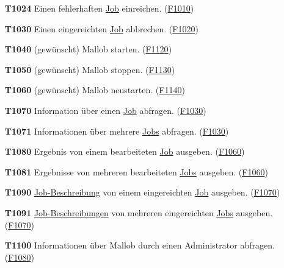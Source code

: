 \begin{itemize}
    \item[\textbf{T1024}] Einen fehlerhaften \hyperref[B:Jobs]{Job} einreichen. (\hyperref[FA:API:Einreichen von Jobs]{F1010})
    
    \item[\textbf{T1030}] Einen eingereichten \hyperref[B:Jobs]{Job} abbrechen. (\hyperref[FA:API:Abbrechen von eingereichten Jobs]{F1020})
    
    \item[\textbf{T1040}] (gewünscht) \gls{Mallob} starten. (\hyperref[FA:API:Starten von \gls{Mallob}]{F1120})
    
    \item[\textbf{T1050}] (gewünscht) \gls{Mallob} stoppen. (\hyperref[FA:API:Stoppen von \gls{Mallob}]{F1130})
    
    \item[\textbf{T1060}] (gewünscht) \gls{Mallob} neustarten. (\hyperref[FA:API:Neustart von \gls{Mallob}]{F1140})
    
    \item[\textbf{T1070}] Information über einen \hyperref[B:Jobs]{Job} abfragen. (\hyperref[FA:API:Abfragen der Informationenen von Jobs]{F1030})
    
    \item[\textbf{T1071}] Informationen über mehrere \hyperref[B:Jobs]{Jobs} abfragen. (\hyperref[FA:API:Abfragen der Informationenen von Jobs]{F1030})
    
    \item[\textbf{T1080}] Ergebnis von einem bearbeiteten \hyperref[B:Jobs]{Job} ausgeben. (\hyperref[FA:API:Ausgeben des Ergebnisses für eine oder mehrere Jobs]{F1060})
    
    \item[\textbf{T1081}] Ergebnisse von mehreren bearbeiteten \hyperref[B:Jobs]{Jobs} ausgeben. (\hyperref[FA:API:Ausgeben des Ergebnisses für eine oder mehrere Jobs]{F1060})
    
    \item[\textbf{T1090}] \hyperref[B:Job-Beschreibung]{Job-Beschreibung} von einem eingereichten \hyperref[B:Jobs]{Job} ausgeben. (\hyperref[FA:API:Ausgeben der Job-Beschreibung]{F1070})
    
    \item[\textbf{T1091}] \hyperref[B:Job-Beschreibung]{Job-Beschreibungen} von mehreren eingereichten \hyperref[B:Jobs]{Jobs} ausgeben. (\hyperref[FA:API:Ausgeben der Job-Beschreibung]{F1070})
    
    \item[\textbf{T1100}] Informationen über \gls{Mallob} durch einen \gls{Administrator} abfragen. (\hyperref[FA:API:Abfragen der Informationen von \gls{Mallob}]{F1080})
    

\end{itemize}
